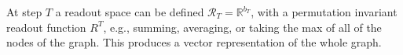 \documentclass{article}
\theoremstyle{plain}
\theoremstyle{definition}
\theoremstyle{remark}
\newcommand{\ron}[1]{{{\textcolor{red}{\textbf{[Ron:} {#1}\textbf{]}}}}}
\begin{document}
At step $T$ a readout space can be defined $\mathcal{R}_T = \mathbb{R}^{b_T}$, with a permutation invariant readout function $R^T$, e.g., summing, averaging, or taking the max of all of the nodes of the graph. %
This produces a vector representation of the whole graph. %



 







 
\end{document}
